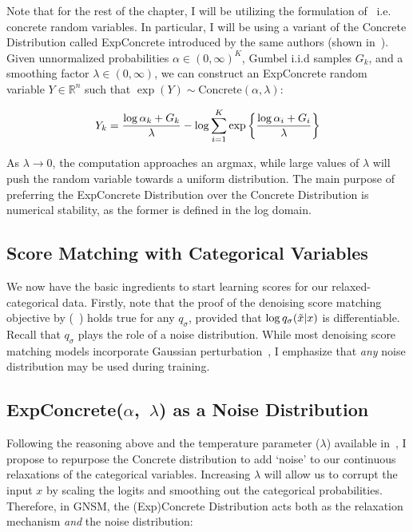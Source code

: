 Note that for the rest of the chapter, I will be utilizing the formulation of~\cite{maddison2017concrete} i.e. concrete random variables. In particular, I will be using a variant of the Concrete Distribution called ExpConcrete introduced by the same authors (shown in~). Given unnormalized probabilities $\alpha \in (0, \infty)^K$, Gumbel i.i.d samples $\mathit{G}_k$, and a smoothing factor $\lambda \in (0, \infty)$, we can construct an ExpConcrete random variable $Y \in \mathbb{R}^n$ such that $\exp(Y) \sim \text{Concrete}(\alpha, \lambda) $:

\begin{equation}
    Y_k = \frac{\log \alpha_k + G_k}{\lambda} - \log \sum_{i=1}^{K} \exp \left\{ {\frac{\log \alpha_i + G_i}{\lambda}} \right\}
    \label{eq:log_concrete}
\end{equation}

As $\lambda \rightarrow 0$, the computation approaches an argmax, while large values of $\lambda$ will push the random variable towards a uniform distribution. The main purpose of preferring the ExpConcrete Distribution over the Concrete Distribution is numerical stability, as the former is defined in the log domain.


\subsection*{Score Matching with Categorical Variables}

We now have the basic ingredients to start learning scores for our relaxed-categorical data.
Firstly, note that the proof of the denoising score matching objective by \cite{vincent2011connection} (~) holds true for any $q_\sigma$, provided that $\log q_{\sigma}(\Tilde{x} |x)$ is differentiable.
Recall that $q_\sigma$ plays the role of a noise distribution. While most denoising score matching models incorporate Gaussian perturbation~\cite{Song2019,song2020score,vincent2011connection}, I emphasize that \textit{any} noise distribution may be used during training.

\subsection*{ExpConcrete($\alpha$,~$\lambda$) as a Noise Distribution}
\label{combine}

Following the reasoning above and the temperature parameter ($\lambda$) available in~, I propose to repurpose the Concrete distribution to add `noise' to our continuous relaxations of the categorical variables. Increasing $\lambda$ will allow us to corrupt the input $x$ by scaling the logits and smoothing out the categorical probabilities. Therefore, in GNSM, the (Exp)Concrete Distribution acts both as the relaxation mechanism \textit{and} the noise distribution:


